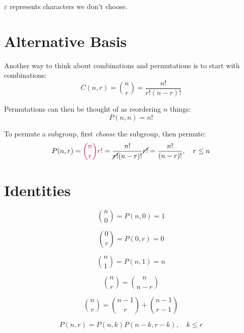 \documentclass{article}
\begin{document}
    $\varepsilon$ represents characters we don't choose.
    
    \section{Alternative Basis}

    Another way to think about combinations and permutations is to start with combinations: \begin{equation}
        C(n, r) = {n \choose r} = \frac{n!}{r!(n - r)!}
    \end{equation}

    Permutations can then be thought of as reordering $n$ things: \begin{equation}
        P(n, n) = n!
    \end{equation}
        
    To permute a subgroup, first \textit{choose} the subgroup, then permute: \begin{equation}
        P(n, r) = \color{purple}{n \choose r}r!\color{black} = \frac{n!}{\cancel{r!}(n - r)!}\cancel{r!} = \frac{n!}{(n - r)!}, \quad r \leq n
    \end{equation}

    \section{Identities}
    
    \begin{equation}
        {n \choose 0} = P(n, 0) = 1
    \end{equation}

    \begin{equation}
        {0 \choose r} = P(0, r) = 0
    \end{equation}
    
    \begin{equation}
        {n \choose 1} = P(n, 1) = n
    \end{equation}
    
    \begin{equation}
        {n \choose r} = {n \choose n - r}
    \end{equation}

    \begin{equation}
        {n \choose r} = {n - 1 \choose r} + {n - 1 \choose r - 1}
    \end{equation}

    \begin{equation}
        P(n, r) = P(n, k)P(n - k, r - k), \quad k \leq r
    \end{equation}
\end{document}
